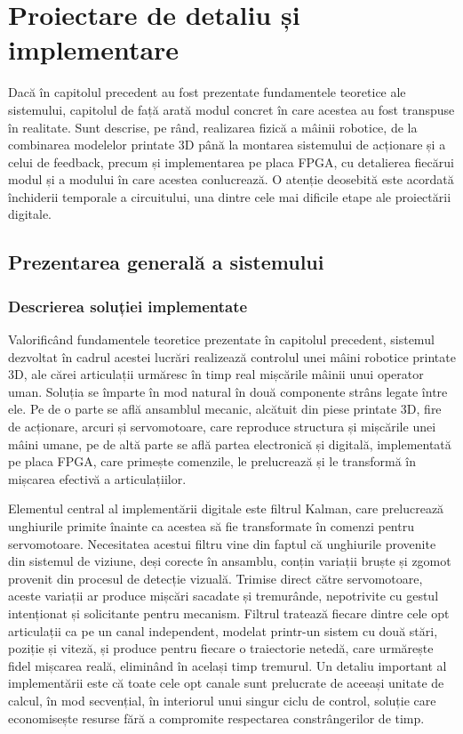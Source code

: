 \chapter{Proiectare de detaliu și implementare}
\label{ch:proiectare}
\pagestyle{fancy}

Dacă în capitolul precedent au fost prezentate fundamentele teoretice ale
sistemului, capitolul de față arată modul concret în care acestea au fost
transpuse în realitate. Sunt descrise, pe rând, realizarea fizică a mâinii
robotice, de la combinarea modelelor printate 3D până la montarea sistemului de
acționare și a celui de feedback, precum și implementarea pe placa FPGA, cu
detalierea fiecărui modul și a modului în care acestea conlucrează. O atenție
deosebită este acordată închiderii temporale a circuitului, una dintre cele mai
dificile etape ale proiectării digitale.

\section{Prezentarea generală a sistemului}
\label{sec:proiectare-general}

\subsection{Descrierea soluției implementate}

Valorificând fundamentele teoretice prezentate în capitolul precedent, sistemul
dezvoltat în cadrul acestei lucrări realizează controlul unei mâini robotice
printate 3D, ale cărei articulații urmăresc în timp real mișcările mâinii unui
operator uman. Soluția se împarte în mod natural în două componente strâns legate
între ele. Pe de o parte se află ansamblul mecanic, alcătuit din piese printate 3D,
fire de acționare, arcuri și servomotoare, care reproduce structura și mișcările
unei mâini umane, pe de altă parte se află partea electronică și digitală,
implementată pe placa FPGA, care primește comenzile, le prelucrează și le transformă
în mișcarea efectivă a articulațiilor.

Elementul central al implementării digitale este filtrul Kalman, care prelucrează
unghiurile primite înainte ca acestea să fie transformate în comenzi pentru
servomotoare. Necesitatea acestui filtru vine din faptul că unghiurile provenite din
sistemul de viziune, deși corecte în ansamblu, conțin variații bruște și zgomot
provenit din procesul de detecție vizuală. Trimise direct către servomotoare, aceste
variații ar produce mișcări sacadate și tremurânde, nepotrivite cu gestul intenționat
și solicitante pentru mecanism. Filtrul tratează fiecare dintre cele opt articulații
ca pe un canal independent, modelat printr-un sistem cu două stări, poziție și
viteză, și produce pentru fiecare o traiectorie netedă, care urmărește fidel mișcarea
reală, eliminând în același timp tremurul. Un detaliu important al implementării este
că toate cele opt canale sunt prelucrate de aceeași unitate de calcul, în mod
secvențial, în interiorul unui singur ciclu de control, soluție care economisește
resurse fără a compromite respectarea constrângerilor de timp.

